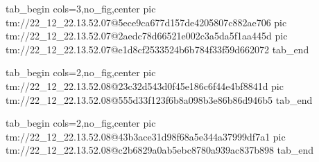  
 
 
 
 

\qqSecCmtScr


\ifcmt
  tab_begin cols=3,no_fig,center
    pic tm://22_12_22.13.52.07@5ece9ca677d157de4205807c882ae706
    pic tm://22_12_22.13.52.07@2aedc78d66521e002c3a5da5f1aa445d
    pic tm://22_12_22.13.52.07@e1d8cf2533524b6b784f33f59d662072
  tab_end
\fi


\ifcmt
  tab_begin cols=2,no_fig,center
    pic tm://22_12_22.13.52.08@23c32d543d0f45e186c6f44e4bf8841d
    pic tm://22_12_22.13.52.08@555d33f123f6b8a098b3e86b86d946b5
  tab_end
\fi


\ifcmt
  tab_begin cols=2,no_fig,center
    pic tm://22_12_22.13.52.08@43b3ace31d98f68a5e344a37999df7a1
    pic tm://22_12_22.13.52.08@c2b6829a0ab5ebc8780a939ac837b898
  tab_end
\fi

